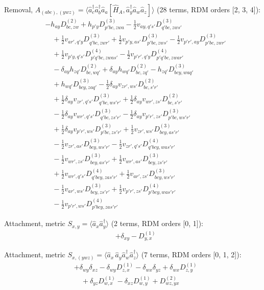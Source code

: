 \noindent Removal, $A_{(abc),(ywz)}=\langle \hat a_c^\dagger \hat a_b^\dagger \hat a_a[\hat H_A,\hat a_y^\dagger \hat a_w\hat a_z]\rangle$ (28 terms, RDM orders [2, 3, 4]):
\begin{align*}
&-h_{ay}D^{(2)}_{bc,zw}+h_{p'y}D^{(3)}_{p'bc,zwa}-\tfrac12v_{ay,q's'}D^{(3)}_{q'bc,zws'} \\
&\quad +\tfrac12v_{ar',q'y}D^{(3)}_{q'bc,zwr'}+\tfrac12v_{p'y,as'}D^{(3)}_{p'bc,zws'}-\tfrac12v_{p'r',ay}D^{(3)}_{p'bc,zwr'} \\
&\quad +\tfrac12v_{p'y,q's'}D^{(4)}_{p'q'bc,zwas'}-\tfrac12v_{p'r',q'y}D^{(4)}_{p'q'bc,zwar'} \\
&\quad -\delta_{ay}h_{zq'}D^{(2)}_{bc,wq'}+\delta_{ay}h_{wq'}D^{(2)}_{bc,zq'}-h_{zq'}D^{(3)}_{bcy,waq'} \\
&\quad +h_{wq'}D^{(3)}_{bcy,zaq'}-\tfrac12\delta_{ay}v_{zr',ws'}D^{(2)}_{bc,s'r'} \\
&\quad +\tfrac12\delta_{ay}v_{zr',q's'}D^{(3)}_{q'bc,ws'r'}+\tfrac12\delta_{ay}v_{wr',zs'}D^{(2)}_{bc,s'r'} \\
&\quad -\tfrac12\delta_{ay}v_{wr',q's'}D^{(3)}_{q'bc,zs'r'}-\tfrac12\delta_{ay}v_{p'r',zs'}D^{(3)}_{p'bc,ws'r'} \\
&\quad +\tfrac12\delta_{ay}v_{p'r',ws'}D^{(3)}_{p'bc,zs'r'}+\tfrac12v_{zr',ws'}D^{(3)}_{bcy,as'r'} \\
&\quad -\tfrac12v_{zr',as'}D^{(3)}_{bcy,ws'r'}-\tfrac12v_{zr',q's'}D^{(4)}_{q'bcy,was'r'} \\
&\quad -\tfrac12v_{wr',zs'}D^{(3)}_{bcy,as'r'}+\tfrac12v_{wr',as'}D^{(3)}_{bcy,zs'r'} \\
&\quad +\tfrac12v_{wr',q's'}D^{(4)}_{q'bcy,zas'r'}+\tfrac12v_{ar',zs'}D^{(3)}_{bcy,ws'r'} \\
&\quad -\tfrac12v_{ar',ws'}D^{(3)}_{bcy,zs'r'}+\tfrac12v_{p'r',zs'}D^{(4)}_{p'bcy,was'r'} \\
&\quad -\tfrac12v_{p'r',ws'}D^{(4)}_{p'bcy,zas'r'}
\end{align*}

\noindent Attachment, metric $S_{x,y}=\langle \hat a_x\hat a_y^\dagger\rangle$ (2 terms, RDM orders [0, 1]):
\begin{align*}
&+\delta_{xy}-D^{(1)}_{y,x}
\end{align*}

\noindent Attachment, metric $S_{x,(ywz)}=\langle \hat a_x\,\hat a_y\hat a_w^\dagger \hat a_z^\dagger\rangle$ (7 terms, RDM orders [0, 1, 2]):
\begin{align*}
&+\delta_{wy}\delta_{xz}-\delta_{wy}D^{(1)}_{z,x}-\delta_{wx}\delta_{yz}+\delta_{wx}D^{(1)}_{z,y} \\
&\quad +\delta_{yz}D^{(1)}_{w,x}-\delta_{xz}D^{(1)}_{w,y}+D^{(2)}_{wz,yx}
\end{align*}

